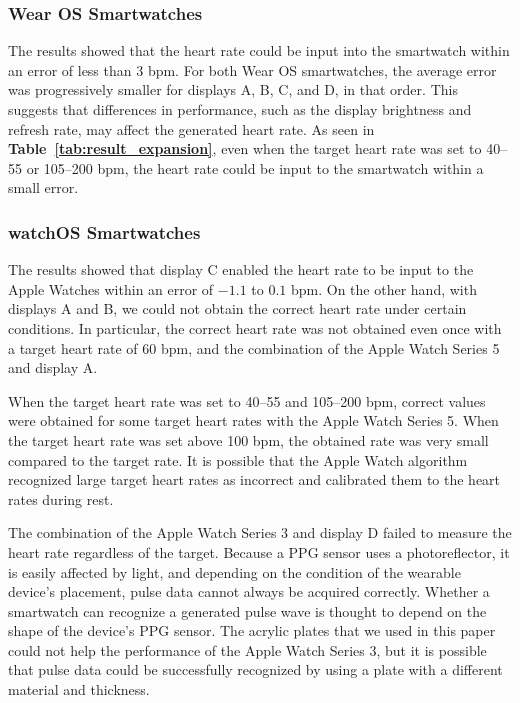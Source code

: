 \documentclass{ieeeaccess}
\newcommand\tabref[1]{\textbf{Table~\ref{tab:#1}}}
\begin{document}
\subsubsection{Wear OS Smartwatches}
The results showed that the heart rate could be input into the smartwatch within an error of less than $3$ bpm. For both Wear OS smartwatches, the average error was progressively smaller for displays A, B, C, and D, in that order. This suggests that differences in performance, such as the display brightness and refresh rate, may affect the generated heart rate. As seen in \tabref{result_expansion}, even when the target heart rate was set to 40--55 or 105--200 bpm, the heart rate could be input to the smartwatch within a small error.

\subsubsection{watchOS Smartwatches}
The results showed that display C enabled the heart rate to be input to the Apple Watches within an error of $-1.1$ to $0.1$ bpm. On the other hand, with displays A and B, we could not obtain the correct heart rate under certain conditions. In particular, the correct heart rate was not obtained even once with a target heart rate of 60 bpm, and the combination of the Apple Watch Series 5 and display A.\par

When the target heart rate was set to 40--55 and 105--200 bpm, correct values were obtained for some target heart rates with the Apple Watch Series 5. When the target heart rate was set above 100 bpm, the obtained rate was very small compared to the target rate. It is possible that the Apple Watch algorithm recognized large target heart rates as incorrect and calibrated them to the heart rates during rest.\par

The combination of the Apple Watch Series 3 and display D failed to measure the heart rate regardless of the target. Because a PPG sensor uses a photoreflector, it is easily affected by light, and depending on the condition of the wearable device's placement, pulse data cannot always be acquired correctly. Whether a smartwatch can recognize a generated pulse wave is thought to depend on the shape of the device's PPG sensor. The acrylic plates that we used in this paper could not help the performance of the Apple Watch Series 3, but it is possible that pulse data could be successfully recognized by using a plate with a different material and thickness.
\end{document}
